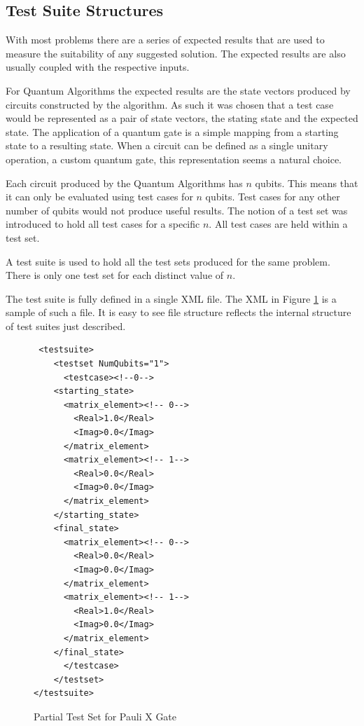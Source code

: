 \subsection{Test Suite Structures}
\label{sec:testsuitestruc}
With most problems there are a series of expected results that are used to measure the suitability of any suggested solution.
The expected results are also usually coupled with the respective inputs.

For Quantum Algorithms the expected results are the state vectors produced by circuits constructed by the algorithm.
As such it was chosen that a test case would be represented as a pair of state vectors, the stating state and the expected state.
The application of a quantum gate is a simple mapping from a starting state to a resulting state.
When a circuit can be defined as a single unitary operation, a custom quantum gate, this representation seems a natural choice.

Each circuit produced by the Quantum Algorithms has $n$ qubits.
This means that it can only be evaluated using test cases for $n$ qubits.
Test cases for any other number of qubits would not produce useful results.
The notion of a test set was introduced to hold all test cases for a specific $n$.
All test cases are held within a test set.

A test suite is used to hold all the test sets produced for the same problem.
There is only one test set for each distinct value of $n$.

The test suite is fully defined in a single XML file.
The XML in Figure \ref{code:paulixtestset} is a sample of such a file.
It is easy to see file structure reflects the internal structure of test suites just described.

\lstset{language = XML}
\begin{figure}
 \begin{lstlisting}
 <testsuite>
    <testset NumQubits="1">
      <testcase><!--0-->
	<starting_state>
	  <matrix_element><!-- 0-->
	    <Real>1.0</Real>
	    <Imag>0.0</Imag>
	  </matrix_element>
	  <matrix_element><!-- 1-->
	    <Real>0.0</Real>
	    <Imag>0.0</Imag>
	  </matrix_element>
	</starting_state>
	<final_state>
	  <matrix_element><!-- 0-->
	    <Real>0.0</Real>
	    <Imag>0.0</Imag>
	  </matrix_element>
	  <matrix_element><!-- 1-->
	    <Real>1.0</Real>
	    <Imag>0.0</Imag>
	  </matrix_element>
	</final_state>
      </testcase>
    </testset>
</testsuite>
 \end{lstlisting}
\label{code:paulixtestset}
\caption{Partial Test Set for Pauli X Gate}
\end{figure}

